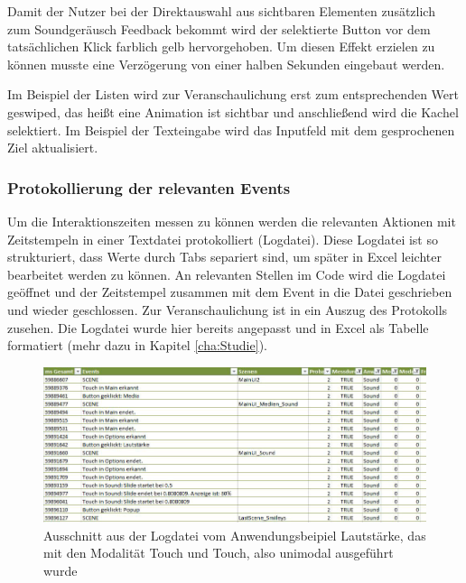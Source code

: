 Damit der Nutzer bei der Direktauswahl aus sichtbaren Elementen zusätzlich zum Soundgeräusch Feedback bekommt wird der selektierte Button vor dem tatsächlichen Klick farblich gelb hervorgehoben. 
Um diesen Effekt erzielen zu können musste eine Verzögerung von einer halben Sekunden eingebaut werden.

Im Beispiel der Listen wird zur Veranschaulichung erst zum entsprechenden Wert geswiped, das heißt eine Animation ist sichtbar und anschließend wird die Kachel selektiert. 
Im Beispiel der Texteingabe wird das Inputfeld mit dem gesprochenen Ziel aktualisiert.

\subsubsection[Protokollierung]{Protokollierung der relevanten Events}
Um die Interaktionszeiten messen zu können werden die relevanten Aktionen mit Zeitstempeln in einer Textdatei protokolliert (Logdatei). 
Diese Logdatei ist so strukturiert, dass Werte durch Tabs separiert sind, um später in Excel leichter bearbeitet werden zu können.
An relevanten Stellen im Code wird die Logdatei geöffnet und der Zeitstempel zusammen mit dem Event in die Datei geschrieben und wieder geschlossen. 
Zur Veranschaulichung ist in  ein Auszug des Protokolls zusehen. 
Die Logdatei wurde hier bereits angepasst und in Excel als Tabelle formatiert (mehr dazu in Kapitel \ref{cha:Studie}). 
\begin{figure}[ht]
	\centering
		\includegraphics[width=1\textwidth]{img/Auszug_Logging_Sound_TT.JPG}
	\caption[Ausschnitt aus der Logdatei vom Anwendungsbeipiel Lautstärke]{Ausschnitt aus der Logdatei vom Anwendungsbeipiel Lautstärke, das mit den Modalität Touch und Touch, also unimodal ausgeführt wurde}
	\label{fig:Auszug_Logging_Sound_TT}
\end{figure}

